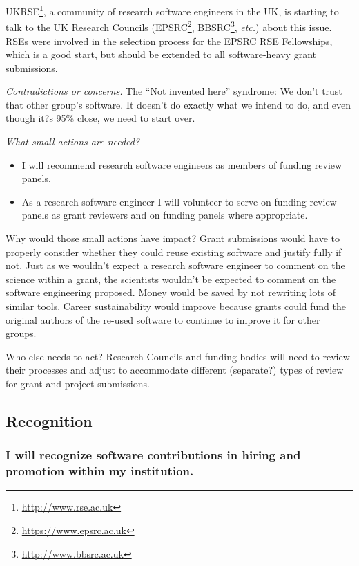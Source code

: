 \documentclass[a4paper,UKenglish]{dagman}
\renewcommand{\paragraph}[1]{\subsubsection*{#1}\xspace}
\newcommand{\etc}{\emph{etc.}\xspace}
\begin{document}

UKRSE\footnote{\url{http://www.rse.ac.uk}}, a community of research software engineers in the UK, is starting to talk to the UK Research Councils (EPSRC\footnote{\url{https://www.epsrc.ac.uk}}, BBSRC\footnote{\url{http://www.bbsrc.ac.uk}}, \etc) about this issue. RSEs were involved in the selection process for the EPSRC RSE Fellowships, which is a good start, but should be extended to all software-heavy grant submissions.

\emph{Contradictions or concerns.}
The ``Not invented here'' syndrome: We don't trust that other group's software.
It doesn't do exactly what we intend to do, and even though it?s 95\% close, we need to start over.

\emph{What small actions are needed?}
\begin{itemize}
\item I will recommend research software engineers as members of funding review panels.
\item As a research software engineer I will volunteer to serve on funding review panels as grant reviewers and on funding panels where appropriate.
\end{itemize}

Why would those small actions have impact?
Grant submissions would have to properly consider whether they could reuse existing software and justify fully if not.
Just as we wouldn't expect a research software engineer to comment on the science within a grant, the scientists wouldn't be expected to comment on the software engineering proposed.
Money would be saved by not rewriting lots of similar tools.
Career sustainability would improve because grants could fund the original authors of the re-used software to continue to improve it for other groups.

Who else needs to act?
Research Councils and funding bodies will need to review their processes and adjust to accommodate different (separate?) types of review for grant and project submissions.

\subsection{Recognition}


\paragraph{I will recognize software contributions in hiring and promotion within my institution.}
\end{document}
